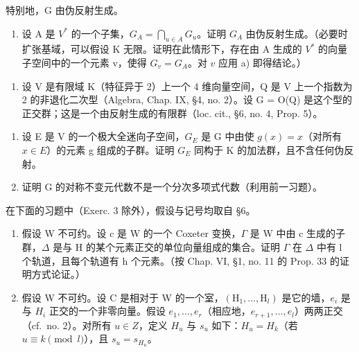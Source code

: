 特别地，G 由伪反射生成。

\begin{enumerate}
\def\labelenumi{\alph{enumi})}
\setcounter{enumi}{1}
\tightlist
\item
  设 A 是 \(V^{*}\) 的一个子集，\(G_{A} = \bigcap_{u \in A} G_{u}\)。证明 \(G_{A}\) 由伪反射生成。（必要时扩张基域，可以假设 K 无限。证明在此情形下，存在由 A 生成的 \(V^{*}\) 的向量子空间中的一个元素 v，使得 \(G_{v} = G_{A}\)。对 \(v\) 应用 a) 即得结论。）
\end{enumerate}

\begin{enumerate}
\def\labelenumi{\arabic{enumi})}
\setcounter{enumi}{8}
\tightlist
\item
  设 V 是有限域 K（特征异于 2）上一个 4 维向量空间，Q 是 V 上一个指数为 2 的非退化二次型（Algebra, Chap. IX, §4, no. 2）。设 G = O(Q) 是这个型的正交群；这是一个由反射生成的有限群（loc. cit., §6, no. 4, Prop. 5）。
\end{enumerate}

\begin{enumerate}
\def\labelenumi{\alph{enumi})}
\item
  设 E 是 V 的一个极大全迷向子空间，\(G_{E}\) 是 G 中由使 \(g(x) = x\)（对所有 \(x \in E\)）的元素 g 组成的子群。证明 \(G_{E}\) 同构于 K 的加法群，且不含任何伪反射。
\item
  证明 G 的对称不变元代数不是一个分次多项式代数（利用前一习题）。
\end{enumerate}


在下面的习题中（Exerc. 3 除外），假设与记号均取自 §6。

\begin{enumerate}
\def\labelenumi{\arabic{enumi})}
\item
  假设 W 不可约。设 c 是 W 的一个 Coxeter 变换，\(\Gamma\) 是 W 中由 c 生成的子群，\(\Delta\) 是与 H 的某个元素正交的单位向量组成的集合。证明 \(\Gamma\) 在 \(\Delta\) 中有 l 个轨道，且每个轨道有 h 个元素。（按 Chap. VI, §1, no. 11 的 Prop. 33 的证明方式论证。）
\item
  假设 W 不可约。设 C 是相对于 W 的一个室，\((\mathrm{H}_{1},\ldots,\mathrm{H}_{l})\) 是它的墙，\(e_{i}\) 是与 \(H_{i}\) 正交的一个非零向量。假设 \(e_{1},\ldots,e_{r}\)（相应地，\(e_{r+1},\ldots,e_{l}\)）两两正交（cf.~no. 2）。对所有 \(u\in Z\)，定义 \(H_{u}\) 与 \(s_{u}\) 如下：\(H_{u}=H_{k}\)（若 \(u\equiv k\pmod{l}\)），且 \(s_{u}=s_{H_{u}}\)。
\end{enumerate}

